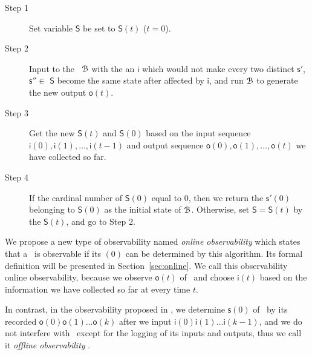  
\begin{description}
	\item[Step 1]  Set variable $\mathsf{S}$ be set to $\mathsf{S}(t)$ ($t=0$).
	\item[Step 2] Input to the \BCN\ ${\mathcal{B}}$ with the an $\mathsf{i}$ which would not make every two distinct $\mathsf{s}'$, $\mathsf{s}''$$\in$ $\mathsf{S}$ become the same state after affected by $\mathsf{i}$, and run ${\mathcal{B}}$ to generate the new output $\mathsf{o}(t)$.
	\item[Step 3] Get the new $\mathsf{S}(t)$ and $\mathsf{S}(0)$ based on the input sequence $\mathsf{i}(0),\mathsf{i}(1),\ldots, \mathsf{i}(t-1)$ and output sequence $\mathsf{o}(0),\mathsf{o}(1),\ldots,\mathsf{o}(t)$ we have collected so far.
	\item[Step 4] If the cardinal number of $\mathsf{S}(0)$ equal to $0$, then we return the $\mathsf{s}'(0)$ belonging to $\mathsf{S}(0)$ as the initial state of ${\mathcal{B}}$. Otherwise, set $\mathsf{S}=\mathsf{S}(t)$ by the $\mathsf{S}(t)$, and go to Step 2.
\end{description}



We propose a new type of observability named {\em online observability} which states that a \BCN\ is observable if its \State$(0)$ can be determined by this algorithm. Its formal definition will be presented in Section~\ref{sec:online}.  We call this observability online observability, because we observe $\mathsf{o}(t)$ of \BCN\ and choose $\mathsf{i}(t)$ based on the information we have collected so far at every time $t$. 

In contrast, in the observability proposed in \cite{Cheng2011Identification}, we determine $\mathsf{s}(0)$ of \BCN\ by its recorded $\mathsf{o}(0)\mathsf{o}(1)\ldots\mathsf{o}(k)$ after we input $\mathsf{i}(0)\mathsf{i}(1)\ldots\mathsf{i}(k-1)$, and  we do not interfere with \BCN\ except for the logging of its inputs and outputs, thus we call it {\em offline observability} \cite{Cassar2017A}.
 

